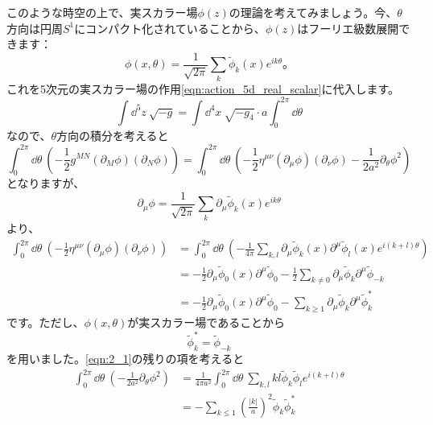 \documentclass[unicode,a4paper,11pt]{ltjsarticle}
\begin{document}
このような時空の上で、実スカラー場$\phi(z)$の理論を考えてみましょう。今、$\theta$方向は円周$S^{1}$にコンパクト化されていることから、$\phi(z)$はフーリエ級数展開できます：
\begin{equation}
   \phi(x,\theta)
   =
   \frac{1}{\sqrt{2\pi}}
   \sum_{k}\tilde{\phi}_{k}(x)e^{ik\theta}
   \text{。}
\end{equation}
これを5次元の実スカラー場の作用\eqref{eqn:action_5d_real_scalar}に代入します。
\begin{equation}
   \int\dd^5 z\
   \sqrt{-g}
   =
   \int\dd^4 x\ \sqrt{-g_{4}}
   \cdot
   a\int_{0}^{2\pi}\dd \theta
\end{equation}
なので、$\theta$方向の積分を考えると
\begin{equation}
   \int_{0}^{2\pi}\dd \theta\
   \left(
   -\frac{1}{2}g^{MN}(\partial_{M}\phi)(\partial_{N}\phi)
   \right)
   =
   \int_{0}^{2\pi}\dd \theta\
   \left(
   -
   \frac{1}{2}\eta^{\mu\nu}(\partial_{\mu}\phi)(\partial_{\nu}\phi)
   -
   \frac{1}{2a^2}\partial_{\theta}\phi^2
   \right)
   \label{eqn:2_1}
\end{equation}
となりますが、
\begin{equation}
   \partial_{\mu}\phi
   =
   \frac{1}{\sqrt{2\pi}}
   \sum_{k}\partial_{\mu}\tilde{\phi}_{k}(x)e^{ik\theta}
\end{equation}
より、
\begin{align}
   \int_{0}^{2\pi}\dd \theta\
   \left(
   -
   \frac{1}{2}\eta^{\mu\nu}(\partial_{\mu}\phi)(\partial_{\nu}\phi)
   \right)
    & =
   \int_{0}^{2\pi}\dd \theta\
   \left(
   -\frac{1}{4\pi}\sum_{k,l}\partial_{\mu}\tilde{\phi}_{k}(x)\partial^{\mu}\tilde{\phi}_{l}(x)e^{i(k+l)\theta}
   \right)
   \nonumber
   \\
    & =
   -\frac{1}{2}\partial_{\mu}\tilde{\phi}_{0}(x)\partial^{\mu}\tilde{\phi}_{0}
   -\frac{1}{2}\sum_{k\neq 0}\partial_{\mu}\tilde{\phi}_{k}\partial^{\mu}\tilde{\phi}_{-k}
   \nonumber
   \\
    & =
   -\frac{1}{2}\partial_{\mu}\tilde{\phi}_{0}(x)\partial^{\mu}\tilde{\phi}_{0}
   -\sum_{k\geq 1}\partial_{\mu}\tilde{\phi}_{k}\partial^{\mu}\tilde{\phi}_{k}^{\ast}
\end{align}
です。ただし、$\phi(x,\theta)$が実スカラー場であることから
\begin{equation}
   \tilde{\phi}_{k}^{\ast}=\tilde{\phi}_{-k}
\end{equation}
を用いました。\eqref{eqn:2_1}の残りの項を考えると
\begin{align}
   \int_{0}^{2\pi}\dd \theta\
   \left(
   -
   \frac{1}{2a^2}\partial_{\theta}\phi^2
   \right)
    & =
   \frac{1}{4\pi a^2}
   \int_{0}^{2\pi}\dd \theta\
   \sum_{k,l}kl\tilde{\phi}_{k}\tilde{\phi}_{l}e^{i(k+l)\theta}
   \nonumber
   \\
    & =
   -\sum_{k\leq 1}\left( \frac{|k|}{a} \right)^2 \tilde{\phi}_{k}\tilde{\phi}_{k}^{\ast}
\end{align}
\end{document}
